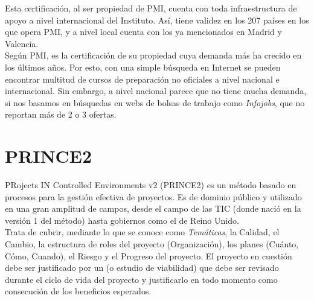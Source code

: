 Esta certificación, al ser propiedad de PMI, cuenta con toda infraestructura de apoyo a nivel internacional del Instituto. Así, tiene validez en los 207 países en los que opera PMI, y a nivel local cuenta con los  ya mencionados en Madrid y Valencia.\\

Según PMI, es la certificación de su propiedad cuya demanda más ha crecido en los últimos años. Por esto, con una simple búsqueda en Internet se pueden encontrar multitud de cursos de preparación no oficiales a nivel nacional e internacional. Sin embargo, a nivel nacional parece que no tiene mucha demanda, si nos basamos en búsquedas en webs de bolsas de trabajo como \emph{Infojobs}, que no reportan más de 2 o 3 ofertas.


\section{PRINCE2}

PRojects IN Controlled Environments v2 (PRINCE2) es un método basado en procesos para la gestión efectiva de proyectos. Es de dominio público y utilizado en una gran amplitud de campos, desde el campo de las TIC (donde nació en la versión 1 del método) hasta gobiernos como el de Reino Unido.\\

Trata de cubrir, mediante lo que se conoce como \emph{Temáticas}, la Calidad, el Cambio, la estructura de roles del proyecto (Organización), los planes (Cuánto, Cómo, Cuando), el Riesgo y el Progreso del proyecto. El proyecto en cuestión debe ser justificado por un  (o estudio de viabilidad) que debe ser revisado durante el ciclo de vida del proyecto y justificarlo en todo momento como consecución de los beneficios esperados.\\

